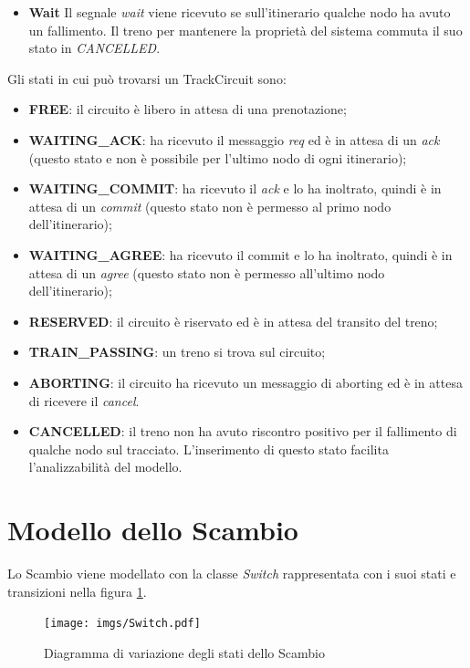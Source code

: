 \begin{itemize}
\item \textbf{Wait} Il segnale \textit{wait} viene ricevuto se sull'itinerario qualche
nodo ha avuto un fallimento. Il treno per mantenere la proprietà del
sistema commuta il suo stato in \textit{CANCELLED}.
\end{itemize}

Gli stati in cui può trovarsi un TrackCircuit sono:
\begin{itemize}
  \item \textbf{FREE}: il circuito è libero in attesa di una prenotazione;
  \item \textbf{WAITING\_ACK}: ha ricevuto il messaggio \textit{req} ed è in
  attesa di un \textit{ack} (questo stato e non è possibile per l’ultimo nodo di ogni
  itinerario);
  \item \textbf{WAITING\_COMMIT}: ha ricevuto il \textit{ack} e lo ha inoltrato,
  quindi è in attesa di un \textit{commit} (questo stato non è permesso al primo
  nodo dell’itinerario);
  \item \textbf{WAITING\_AGREE}: ha ricevuto il commit e lo ha inoltrato, quindi
  è in attesa di un \textit{agree} (questo stato non è permesso all’ultimo nodo
  dell’itinerario);
  \item \textbf{RESERVED}: il circuito è riservato ed è in attesa del transito
  del treno;
  \item \textbf{TRAIN\_PASSING}: un treno si trova sul circuito;
  \item \textbf{ABORTING}: il circuito ha ricevuto un messaggio di aborting ed è
  in attesa di ricevere il \textit{cancel}.
  \item \textbf{CANCELLED}: il treno non ha avuto riscontro positivo per il
  fallimento di qualche nodo sul tracciato. L'inserimento di questo stato
  facilita l'analizzabilità del modello. 
\end{itemize}

\section{Modello dello Scambio}
Lo Scambio viene modellato con la classe \textit{Switch} rappresentata con i
suoi stati e transizioni nella figura \ref{fig:Scambio}.
\begin{figure}

\centering
\texttt{[image: imgs/Switch.pdf]}

\caption{Diagramma di variazione degli stati dello Scambio}\label{fig:Scambio}

\end{figure}

